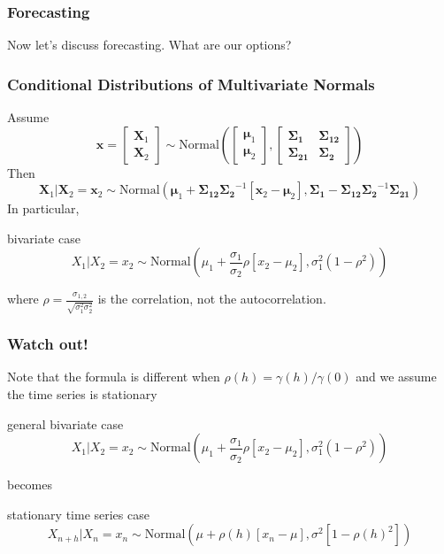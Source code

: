 \documentclass{beamer}
\begin{document}

\begin{frame}
\frametitle{Forecasting}

Now let's discuss forecasting. What are our options?


\end{frame}



\begin{frame}
\frametitle{Conditional Distributions of Multivariate Normals}

Assume 
\[
\mathbf{x} 
= \left[\begin{array}{c}
\mathbf{X}_1 \\
\mathbf{X}_2
\end{array} \right] 
\sim \text{Normal}
\left(
\left[\begin{array}{c}
\pmb{\mu}_1 \\
\pmb{\mu}_2
\end{array} \right],
\left[\begin{array}{cc}
\pmb{\Sigma_1 } & \pmb{\Sigma_{12} } \\
\pmb{\Sigma_{21} } & \pmb{\Sigma_2 }
\end{array}\right]
\right)
\]
Then
\[
\mathbf{X}_1 | \mathbf{X}_2 = \mathbf{x}_2 \sim 
\text{Normal}\left(\pmb{\mu}_1 +  \pmb{\Sigma_{12} } \pmb{\Sigma_2 }^{-1} [\mathbf{x}_2 - \pmb{\mu}_2 ],
\pmb{\Sigma_1 } - \pmb{\Sigma_{12} }\pmb{\Sigma_2 }^{-1} \pmb{\Sigma_{21} }\right)
\]
In particular,  
\begin{block}{bivariate case}
\[
X_1 | X_2 = x_2 \sim 
\text{Normal}\left(\mu_1 +  \frac{\sigma_1}{\sigma_2} \rho [x_2 - \mu_2 ],
\sigma^2_1(1 - \rho^2) \right)
\]
\end{block}
where $\rho = \frac{\sigma_{1,2}}{\sqrt{\sigma_1^2 \sigma_2^2 }}$ is the correlation, not the autocorrelation.
\end{frame}


\begin{frame}
\frametitle{Watch out!}

Note that the formula is different when $\rho(h) = \gamma(h)/\gamma(0)$ and we assume the time series is stationary
\begin{block}{general bivariate case}
\[
X_1 | X_2 = x_2 \sim 
\text{Normal}\left(\mu_1 +  \frac{\sigma_1}{\sigma_2} \rho [x_2 - \mu_2 ],
\sigma^2_1(1 - \rho^2) \right)
\]
\end{block}
becomes
\begin{block}{stationary time series case}
\[
X_{n+h} | X_n = x_n \sim 
\text{Normal}\left(\mu +   \rho(h) [x_n - \mu ],
\sigma^2[1 - \rho(h)^2] \right)
\]
\end{block}


\end{frame}
\end{document}
